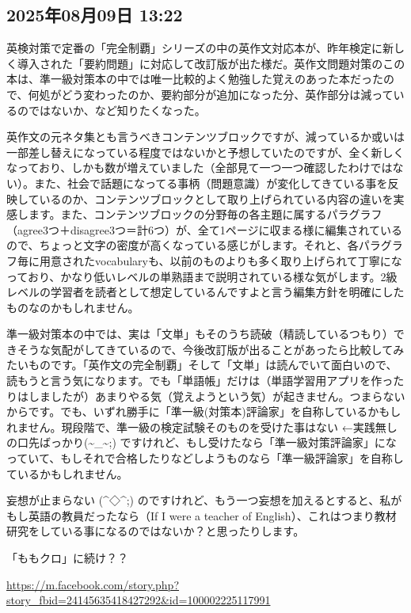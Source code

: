 \documentclass[facebook_diary.tex]{subfiles}
\begin{document}
\subsection*{2025年08月09日 13:22}

英検対策で定番の「完全制覇」シリーズの中の英作文対応本が、昨年検定に新しく導入された「要約問題」に対応して改訂版が出た様だ。英作文問題対策のこの本は、準一級対策本の中では唯一比較的よく勉強した覚えのあった本だったので、何処がどう変わったのか、要約部分が追加になった分、英作部分は減っているのではないか、など知りたくなった。


英作文の元ネタ集とも言うべきコンテンツブロックですが、減っているか或いは一部差し替えになっている程度ではないかと予想していたのですが、全く新しくなっており、しかも数が増えていました（全部見て一つ一つ確認したわけではない）。また、社会で話題になってる事柄（問題意識）が変化してきている事を反映しているのか、コンテンツブロックとして取り上げられている内容の違いを実感します。また、コンテンツブロックの分野毎の各主題に属するパラグラフ（agree3つ＋disagree3つ＝計6つ）が、全て1ページに収まる様に編集されているので、ちょっと文字の密度が高くなっている感じがします。それと、各パラグラフ毎に用意されたvocabularyも、以前のものよりも多く取り上げられて丁寧になっており、かなり低いレベルの単熟語まで説明されている様な気がします。2級レベルの学習者を読者として想定しているんですよと言う編集方針を明確にしたものなのかもしれません。


準一級対策本の中では、実は「文単」もそのうち読破（精読しているつもり）できそうな気配がしてきているので、今後改訂版が出ることがあったら比較してみたいものです。「英作文の完全制覇」そして「文単」は読んでいて面白いので、読もうと言う気になります。でも「単語帳」だけは（単語学習用アプリを作ったりはしましたが）あまりやる気（覚えようという気）が起きません。つまらないからです。でも、いずれ勝手に「準一級(対策本)評論家」を自称しているかもしれません。現段階で、準一級の検定試験そのものを受けた事はない ←実践無しの口先ばっかり(\textasciitilde{}\_\textasciitilde{};) ですけれど、もし受けたなら「準一級対策評論家」になっていて、もしそれで合格したりなどしようものなら「準一級評論家」を自称しているかもしれません。

妄想が止まらない (\textasciicircum{}◇\textasciicircum{};)  のですけれど、もう一つ妄想を加えるとすると、私がもし英語の教員だったなら（If I were a teacher of English）、これはつまり教材研究をしている事になるのではないか？と思ったりします。


「ももクロ」に続け？？

\url{https://m.facebook.com/story.php?story_fbid=24145635418427292&id=100002225117991}
\end{document}

